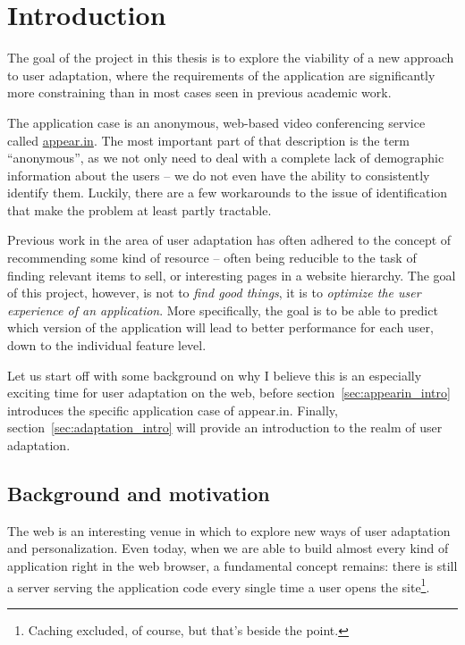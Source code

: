 \chapter{Introduction}

\label{Chapter1}



The goal of the project in this thesis is to explore the viability of a new approach to user adaptation, where the requirements of the application are significantly more constraining than in most cases seen in previous academic work.

The application case is an anonymous, web-based video conferencing service called \url{appear.in}. The most important part of that description is the term ``anonymous'', as we not only need to deal with a complete lack of demographic information about the users -- we do not even have the ability to consistently identify them. Luckily, there are a few workarounds to the issue of identification that make the problem at least partly tractable.

Previous work in the area of user adaptation has often adhered to the concept of recommending some kind of resource -- often being reducible to the task of finding relevant items to sell, or interesting pages in a website hierarchy. The goal of this project, however, is not to \emph{find good things}, it is to \emph{optimize the user experience of an application}. More specifically, the goal is to be able to predict which version of the application will lead to better performance for each user, down to the individual feature level.

Let us start off with some background on why I believe this is an especially exciting time for user adaptation on the web, before section~\ref{sec:appearin_intro} introduces the specific application case of appear.in. Finally, section~\ref{sec:adaptation_intro} will provide an introduction to the realm of user adaptation.

\section{Background and motivation}
\label{sec:motivation}

The web is an interesting venue in which to explore new ways of user adaptation and personalization. Even today, when we are able to build almost every kind of application right in the web browser, a fundamental concept remains: there is still a server serving the application code every single time a user opens the site\footnote{Caching excluded, of course, but that's beside the point.}.

